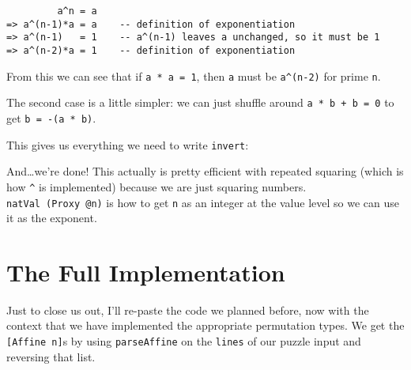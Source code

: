 \documentclass[]{article}
\newenvironment{Shaded}{}{}
\newcommand{\DataTypeTok}[1]{\textcolor[rgb]{0.56,0.13,0.00}{#1}}
\newcommand{\DecValTok}[1]{\textcolor[rgb]{0.25,0.63,0.44}{#1}}
\newcommand{\FunctionTok}[1]{\textcolor[rgb]{0.02,0.16,0.49}{#1}}
\newcommand{\KeywordTok}[1]{\textcolor[rgb]{0.00,0.44,0.13}{\textbf{#1}}}
\newcommand{\NormalTok}[1]{#1}
\newcommand{\OperatorTok}[1]{\textcolor[rgb]{0.40,0.40,0.40}{#1}}
\newcommand{\OtherTok}[1]{\textcolor[rgb]{0.00,0.44,0.13}{#1}}
\begin{document}
\begin{verbatim}
         a^n = a
=> a^(n-1)*a = a    -- definition of exponentiation
=> a^(n-1)   = 1    -- a^(n-1) leaves a unchanged, so it must be 1
=> a^(n-2)*a = 1    -- definition of exponentiation
\end{verbatim}

From this we can see that if \texttt{a\textquotesingle{}\ *\ a\ =\ 1}, then
\texttt{a\textquotesingle{}} must be \texttt{a\^{}(n-2)} for prime \texttt{n}.

The second case is a little simpler: we can just shuffle around
\texttt{a\textquotesingle{}\ *\ b\ +\ b\textquotesingle{}\ =\ 0} to get
\texttt{b\textquotesingle{}\ =\ -(a\textquotesingle{}\ *\ b)}.

This gives us everything we need to write \texttt{invert}:

\begin{Shaded}
\end{Shaded}

And\ldots we're done! This actually is pretty efficient with repeated squaring
(which is how \texttt{\^{}} is implemented) because we are just squaring
numbers. \texttt{natVal\ (Proxy\ @n)} is how to get \texttt{n} as an integer at
the value level so we can use it as the exponent.

\hypertarget{the-full-implementation}{%
\section{The Full Implementation}\label{the-full-implementation}}

Just to close us out, I'll re-paste the code we planned before, now with the
context that we have implemented the appropriate permutation types. We get the
\texttt{{[}Affine\ n{]}}s by using \texttt{parseAffine} on the \texttt{lines} of
our puzzle input and reversing that list.
\end{document}

